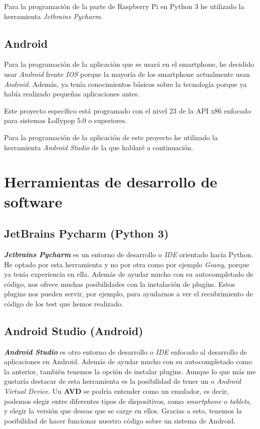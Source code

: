 Para la programación de la parte de Raspberry Pi en Python 3 he utilizado la herramienta \textit{Jetbrains Pycharm}.

\subsection{Android}

Para la programación de la aplicación que se usará en el smartphone, he decidido usar \textit{Android} frente \textit{IOS} porque la mayoría de los smartphone actualmente usan \textit{Android}. Además, ya tenía conocimientos básicos sobre la tecnología porque ya había realizado pequeñas aplicaciones antes.

Este proyecto específico está programado con el nivel 23 de la API x86 enfocado para sistemas Lollypop 5.0 o superiores.

Para la programación de la aplicación de este proyecto he utilizado la herramienta \textit{Android Studio} de la que hablaré a continuación. 

\section{Herramientas de desarrollo de software}

\subsection{JetBrains Pycharm (Python 3)}
\textbf{\textit{Jetbrains Pycharm}} es un entorno de desarrollo o \textit{IDE} orientado hacía Python. He optado por esta herramienta y no por otra como por ejemplo \textit{Geany}, porque ya tenía experiencia en ella. Además de ayudar mucho con su autocompletado de código, nos ofrece muchas posibilidades con la instalación de plugíns. Estos plugins nos pueden servir, por ejemplo, para ayudarnos a ver el recubrimiento de código de los test que hemos realizado.

\subsection{Android Studio (Android)}
\textbf{\textit{Android Studio}} es otro entorno de desarrollo o \textit{IDE} enfocado al desarrollo de aplicaciones en Android. Además de ayudar mucho con su autocompletado como la anterior, también tenemos la opción de instalar plugins. Aunque lo que más me gustaría destacar de esta herramienta es la posibilidad de tener un  o \textit{Android Virtual Device}. Un \textbf{AVD} se podría entender como un emulador, es decir, podemos elegir entre diferentes tipos de dispositivos, como \textit{smartphone} o \textit{tablets}, y elegir la versión que deseas que se carge en ellos. Gracias a esto, tenemos la posibilidad de hacer funcionar nuestro código sobre un sistema de Android.

